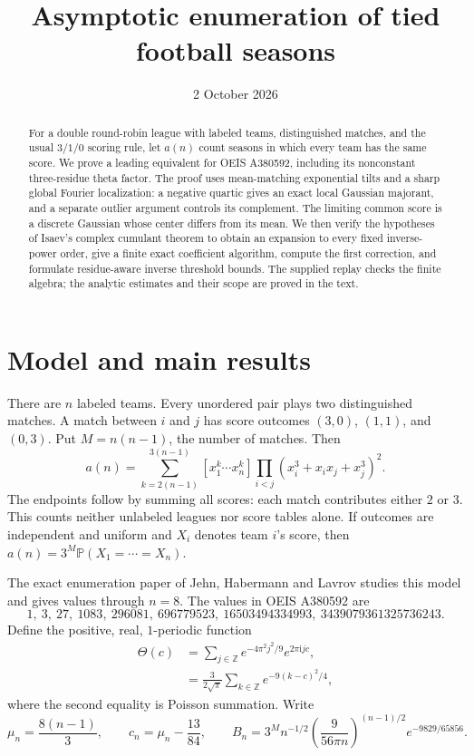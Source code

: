 \documentclass[11pt,a4paper]{article}
\title{Asymptotic enumeration of tied football seasons}
\author{}
\date{2 October 2026}
\numberwithin{equation}{section}
\theoremstyle{remark}
\newcommand{\Prob}{\mathbb P}
\newcommand{\Z}{\mathbb Z}
\newcommand{\1}{\mathbf 1}
\newcommand{\ii}{\mathrm i}
\begin{document}
\maketitle
\vspace{-1.5em}
\begin{abstract}
For a double round-robin league with labeled teams, distinguished matches,
and the usual $3/1/0$ scoring rule, let $a(n)$ count seasons in which every
team has the same score. We prove a leading equivalent for OEIS A380592,
including its nonconstant three-residue theta factor. The proof uses
mean-matching exponential tilts and a sharp global Fourier localization:
a negative quartic gives an exact local Gaussian majorant, and a separate
outlier argument controls its complement. The limiting common score is a
discrete Gaussian whose center differs from its mean. We then verify the
hypotheses of Isaev's complex cumulant theorem to obtain an expansion to
every fixed inverse-power order, give a finite exact coefficient algorithm,
compute the first correction, and formulate residue-aware inverse
threshold bounds. The supplied replay checks the finite algebra; the
analytic estimates and their scope are proved in the text.
\end{abstract}
\tableofcontents
\newpage

\section{Model and main results}\label{tfs:sec:model}
There are $n$ labeled teams. Every unordered pair plays two distinguished
matches. A match between $i$ and $j$ has score outcomes $(3,0)$, $(1,1)$,
and $(0,3)$. Put $M=n(n-1)$, the number of matches. Then
\begin{equation}\label{tfs:eq:exact}
a(n)=\sum_{k=2(n-1)}^{3(n-1)}
 [x_1^k\cdots x_n^k]\prod_{i<j}(x_i^3+x_ix_j+x_j^3)^2.
\end{equation}
The endpoints follow by summing all scores: each match contributes either
$2$ or $3$. This counts neither unlabeled leagues nor score tables alone.
If outcomes are independent and uniform and $X_i$ denotes team $i$'s score,
then $a(n)=3^M\Prob(X_1=\cdots=X_n)$.

The exact enumeration paper of Jehn, Habermann and Lavrov
\cite{football} studies this model and gives values through $n=8$.
The values in OEIS A380592 \cite{oeis} are
\[
1,\ 3,\ 27,\ 1083,\ 296081,\ 696779523,\
16503494334993,\ 3439079361325736243.
\]
Define the positive, real, $1$-periodic function
\begin{align}
\Theta(c)&=\sum_{j\in\Z}e^{-4\pi^2j^2/9}e^{2\pi\ii jc},\label{tfs:eq:theta}\\
&=\frac{3}{2\sqrt\pi}\sum_{k\in\Z}e^{-9(k-c)^2/4},\label{tfs:eq:poisson}
\end{align}
where the second equality is Poisson summation. Write
\begin{equation}\label{tfs:eq:carrier}
\mu_n=\frac{8(n-1)}3,\qquad c_n=\mu_n-\frac{13}{84},\qquad
B_n=3^M n^{-1/2}\left(\frac9{56\pi n}\right)^{(n-1)/2}
 e^{-9829/65856}.
\end{equation}
\end{document}
